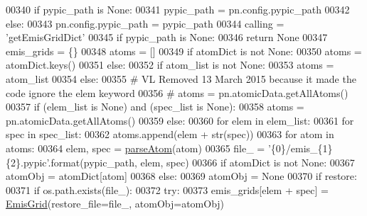 \begin{DoxyCode}
{{{{{{00340     \textcolor{keywordflow}{if} pypic\_path \textcolor{keywordflow}{is} \textcolor{keywordtype}{None}:
00341         pypic\_path = pn.config.pypic\_path
00342     \textcolor{keywordflow}{else}:
00343         pn.config.pypic\_path = pypic\_path
00344     calling = \textcolor{stringliteral}{'getEmisGridDict'}
00345     \textcolor{keywordflow}{if} pypic\_path \textcolor{keywordflow}{is} \textcolor{keywordtype}{None}:
00346         \textcolor{keywordflow}{return} \textcolor{keywordtype}{None}
00347     emis\_grids = \{\}
00348     atoms = []
00349     \textcolor{keywordflow}{if} atomDict \textcolor{keywordflow}{is} \textcolor{keywordflow}{not} \textcolor{keywordtype}{None}:
00350         atoms = atomDict.keys()
00351     \textcolor{keywordflow}{else}:
00352         \textcolor{keywordflow}{if} atom\_list \textcolor{keywordflow}{is} \textcolor{keywordflow}{not} \textcolor{keywordtype}{None}:
00353             atoms = atom\_list
00354         \textcolor{keywordflow}{else}:
00355 \textcolor{comment}{# VL Removed 13 March 2015 because it made the code ignore the elem keyword             }
00356 \textcolor{comment}{#            atoms = pn.atomicData.getAllAtoms()}
00357             \textcolor{keywordflow}{if} (elem\_list \textcolor{keywordflow}{is} \textcolor{keywordtype}{None}) \textcolor{keywordflow}{and} (spec\_list \textcolor{keywordflow}{is} \textcolor{keywordtype}{None}):
00358                 atoms = pn.atomicData.getAllAtoms()
00359             \textcolor{keywordflow}{else}:
00360                 \textcolor{keywordflow}{for} elem \textcolor{keywordflow}{in} elem\_list:
00361                     \textcolor{keywordflow}{for} spec \textcolor{keywordflow}{in} spec\_list:
00362                         atoms.append(elem + str(spec)) 
00363     \textcolor{keywordflow}{for} atom \textcolor{keywordflow}{in} atoms:
00364         elem, spec = \hyperlink{namespacepyneb_1_1utils_1_1misc_a8c069186002a3e73dd474958e35034d5}{parseAtom}(atom)
00365         file\_ = \textcolor{stringliteral}{'\{0\}/emis\_\{1\}\{2\}.pypic'}.format(pypic\_path, elem, spec)
00366         \textcolor{keywordflow}{if} atomDict \textcolor{keywordflow}{is} \textcolor{keywordflow}{not} \textcolor{keywordtype}{None}:
00367             atomObj = atomDict[atom]
00368         \textcolor{keywordflow}{else}:
00369             atomObj = \textcolor{keywordtype}{None}
00370         \textcolor{keywordflow}{if} restore:
00371             \textcolor{keywordflow}{if} os.path.exists(file\_):
00372                 \textcolor{keywordflow}{try}:
00373                     emis\_grids[elem + spec] = \hyperlink{classpyneb_1_1core_1_1emis_grid_1_1_emis_grid}{EmisGrid}(restore\_file=file\_, atomObj=atomObj)
}}}}}}
\end{DoxyCode}
